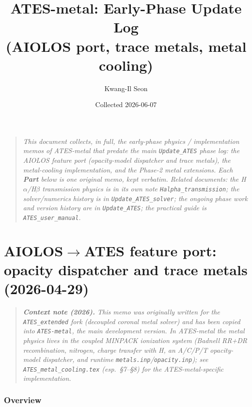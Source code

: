 \documentclass[english,a4paper]{kiseon_memo}
\begin{document}
\title{ATES-metal: Early-Phase Update Log\\(AIOLOS port, trace metals, metal cooling)}
\author{Kwang-Il Seon}
\date{Collected 2026-06-07}
\maketitle

\begin{quote}\small\itshape
This document collects, in full, the early-phase \emph{physics / implementation}
memos of ATES-metal that predate the main \texttt{Update\_ATES} phase log: the
AIOLOS feature port (opacity-model dispatcher and trace metals), the metal-cooling
implementation, and the Phase-2 metal extensions. Each \textbf{Part} below is one
original memo, kept verbatim. Related documents: the H$\alpha$/H$\beta$
transmission physics is in its own note \texttt{Halpha\_transmission}; the
solver/numerics history is in \texttt{Update\_ATES\_solver}; the ongoing phase work
and version history are in \texttt{Update\_ATES}; the practical guide is
\texttt{ATES\_user\_manual}.
\end{quote}

\tableofcontents
\bigskip



\part{AIOLOS$\to$ATES feature port: opacity dispatcher and trace metals (2026-04-29)}

\begin{quote}\small\itshape
\textbf{Context note (2026).} This memo was originally written for the
\texttt{ATES\_extended} fork (decoupled coronal metal solver) and has
been copied into \texttt{ATES-metal}, the main development version. In
ATES-metal the metal physics lives in the coupled MINPACK ionization
system (Badnell RR+DR recombination, nitrogen, charge transfer with H,
an A/C/P/T opacity-model dispatcher, and runtime
\texttt{metals.inp}/\texttt{opacity.inp}); see
\texttt{ATES\_metal\_cooling.tex} (esp.\ \S7--\S8) for the
ATES-metal-specific implementation.
\end{quote}


\section{Overview}
\end{document}
